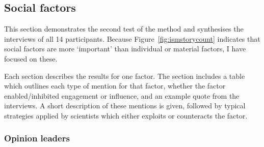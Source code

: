 \subsection{Social factors}\label{sec:ressocial}

This section demonstrates the second test of the method and synthesises the interviews of all 14 participants. Because Figure~\ref{fig:ismstorycount} indicates that social factors are more `important' than individual or material factors, I have focused on these.

Each section describes the results for one factor. The section includes a table which outlines each type of mention for that factor, whether the factor enabled/inhibited engagement or influence, and an example quote from the interviews. A short description of these mentions is given, followed by typical strategies applied by scientists which either exploits or counteracts the factor.

\subsubsection{Opinion leaders}\label{sec:resopinionleaders}

